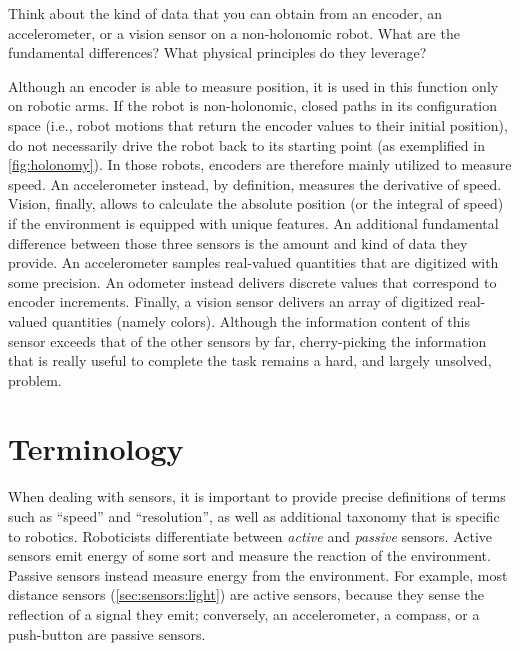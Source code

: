 \begin{mdframed}
Think about the kind of data that you can obtain from an encoder, an accelerometer, or a vision sensor on a non-holonomic robot. What are the fundamental differences? What physical principles do they leverage?
\end{mdframed}

Although an encoder is able to measure position, it is used in this function only on robotic arms. If the robot is non-holonomic, closed paths in its configuration space (i.e., robot motions that return the encoder values to their initial position), do not necessarily drive the robot back to its starting point (as exemplified in \cref{fig:holonomy}).
In those robots, encoders are therefore mainly utilized to measure speed. An accelerometer instead, by definition, measures the derivative of speed. Vision, finally, allows to calculate the absolute position (or the integral of speed) if the environment is equipped with unique features. An additional fundamental difference between those three sensors is the amount and kind of data they provide. An accelerometer samples real-valued quantities that are digitized with some precision. An odometer instead delivers discrete values that correspond to encoder increments. Finally, a vision sensor delivers an array of digitized real-valued quantities (namely colors). Although the information content of this sensor exceeds that of the other sensors by far, cherry-picking the information that is really useful to complete the task remains a hard, and largely unsolved, problem.


\section{Terminology}\label{sec:sensors:terminology}

When dealing with sensors, it is important to provide precise definitions of terms such as ``speed'' and ``resolution'', as well as additional taxonomy that is specific to robotics.
%
Roboticists differentiate between \textsl{active} and \textsl{passive} sensors. Active sensors  emit energy of some sort and measure the reaction of the environment. Passive sensors  instead measure energy from the environment. For example, most distance sensors (\cref{sec:sensors:light}) are active sensors, because they sense the reflection of a signal they emit; conversely, an accelerometer, a compass, or a push-button are passive sensors.

